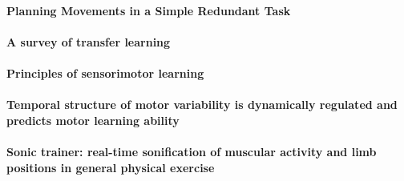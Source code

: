\documentclass[11pt]{article}
\begin{document}
\paragraph{Planning Movements in a Simple Redundant Task} \citep{vetter_planning_2002}

\paragraph{A survey of transfer learning} \citep{weiss_survey_2016}

\paragraph{Principles of sensorimotor learning} \citep{wolpert_principles_2011}

\paragraph{Temporal structure of motor variability is dynamically regulated and predicts motor learning ability} \citep{wu_temporal_2014}

\paragraph{Sonic trainer: real-time sonification of muscular activity and limb positions in general physical exercise} \citep{yang_sonic_2013}

\newpage


\end{document}
